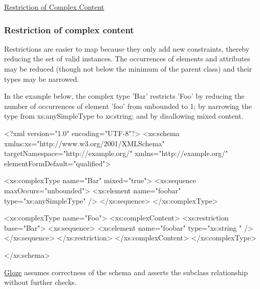 \begin{DoxyItemize}
\item \hyperlink{restrictioncomplexcontent}{Restriction of Complex Content} 
\end{DoxyItemize}\hypertarget{restrictionComplexContent}{}\subsubsection{Restriction of complex content}\label{restrictionComplexContent}
Restrictions are easier to map because they only add new constraints, thereby reducing the set of valid instances. The occurrences of elements and attributes may be reduced (though not below the minimum of the parent class) and their types may be narrowed.

In the example below, the complex type 'Bar' restricts 'Foo' by reducing the number of occurrences of element 'foo' from unbounded to 1; by narrowing the type from xs:anySimpleType to xs:string; and by disallowing mixed content.


\begin{DoxyCodeInclude}
<?xml version="1.0" encoding="UTF-8"?>
<xs:schema xmlns:xs="http://www.w3.org/2001/XMLSchema" 
        targetNamespace="http://example.org/" xmlns="http://example.org/"
        elementFormDefault="qualified">
        
        <xs:complexType name="Bar" mixed="true">
                <xs:sequence maxOccurs="unbounded">
                        <xs:element name="foobar" type="xs:anySimpleType" />
                </xs:sequence>
        </xs:complexType>
        
        <xs:complexType name="Foo">
                <xs:complexContent>
                        <xs:restriction base="Bar">
                                <xs:sequence>
                                        <xs:element name="foobar" type="xs:string
      " />
                                </xs:sequence>
                        </xs:restriction>
                </xs:complexContent>
        </xs:complexType>

</xs:schema>
\end{DoxyCodeInclude}


\hyperlink{classcom_1_1hp_1_1gloze_1_1_gloze}{Gloze} assumes correctness of the schema and asserts the subclass relationship without further checks.


